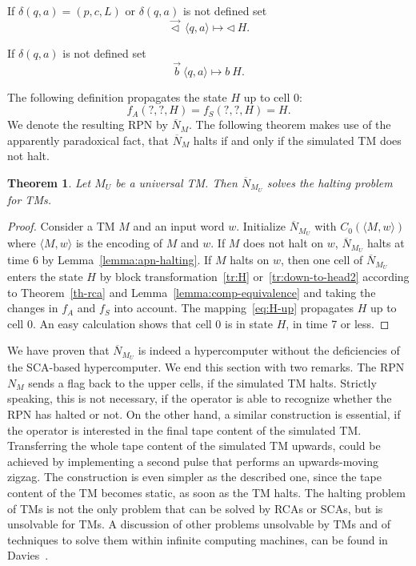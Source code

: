 \documentclass[pre,amssymb,showpacs,showkeys,preprint]{revtex4}
\newtheorem{theorem}{Theorem}
\begin{document}
If $\delta(q,a) = (p,c,L)$ or $\delta(q,a)$ is not defined set
\begin{equation}
\overrightarrow{\lhd} \: \langle q, a \rangle \mapsto \lhd \: H.
\label{tr:H}
\end{equation}

If $\delta(q,a)$ is not defined set
\begin{equation}
\overrightarrow{b} \: \langle q, a \rangle \mapsto b \: H.
\label{tr:down-to-head2}
\end{equation}

The following definition propagates the state $H$ up to cell $0$:
\begin{equation}
f_A(?, ?, H) = f_S(?, ?, H) = H.
\label{eq:H-up}
\end{equation}
We denote the resulting RPN by $\overline{N}_M$.
The following theorem makes use of the apparently paradoxical fact, that $\overline{N}_M$ halts if and only if the
simulated TM does not halt.
\begin{theorem}
Let $M_U$ be a universal TM. Then $\overline{N}_{M_U}$ solves the halting problem for TMs.
\end{theorem}
\begin{proof}
Consider a TM $M$ and an input word $w$. Initialize $\overline{N}_{M_U}$ with $C_0(\langle M, w \rangle )$ where
$\langle M, w \rangle$ is the encoding of $M$ and $w$.
If $M$ does not halt on $w$, $\overline{N}_{M_U}$ halts at time 6 by Lemma~\ref{lemma:apn-halting}.
If $M$ halts on $w$, then one cell of $\overline{N}_{M_U}$ enters the state $H$ by
block transformation~\ref{tr:H} or~\ref{tr:down-to-head2} according to
Theorem~\ref{th-rca} and Lemma~\ref{lemma:comp-equivalence} and taking the changes in $f_A$ and $f_S$ into account.
The mapping~\ref{eq:H-up} propagates $H$ up to cell 0.
An easy calculation shows that cell 0 is in state $H$, in time 7 or less.
\end{proof}

We have proven that $\overline{N}_{M_U}$ is indeed a hypercomputer without the deficiencies of the SCA-based
hypercomputer. We end this section with two remarks.
The RPN $N_M$ sends a flag back to the upper cells, if the simulated TM halts.
Strictly speaking, this is not necessary, if the operator is able to recognize whether the RPN has halted or not.
On the other hand, a similar construction is essential, if the operator is interested in the final tape content of the
simulated TM.
Transferring the whole tape content of the simulated TM upwards,
could be achieved by implementing a second pulse that performs an upwards-moving zigzag.
The construction is even simpler as the described one, since the tape content of the TM becomes static, as soon as the TM halts.
The halting problem of TMs is not the only problem that can be solved by RCAs or SCAs, but is unsolvable for TMs.
A discussion of other problems unsolvable by TMs and of techniques to solve them within infinite computing machines, can be found in
Davies~\cite{Davies01}.
\end{document}
